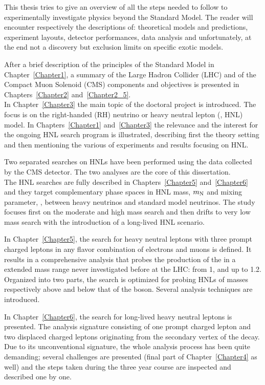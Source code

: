 This thesis tries to give an overview of all the steps needed to follow
to experimentally investigate physics
beyond the Standard Model. The reader will encounter respectively the
descriptions of: theoretical models and predictions, experiment
layouts, detector performances, data analysis and unfortunately, at the
end not a discovery but exclusion limits on specific exotic models.

After a brief description of the principles of the Standard Model in
Chapter~\ref{Chapter1}, a summary of the Large Hadron Collider (LHC)
and of the Compact Muon Solenoid (CMS) components and objectives is
presented in Chapters~\ref{Chapter2} and~\ref{Chapter2_5}.\\
In Chapter~\ref{Chapter3} the main topic of the doctoral project is
introduced. The focus is on the right-handed (RH) neutrino or heavy
neutral lepton (\hnl, HNL)
model. In Chapters~\ref{Chapter1} and~\ref{Chapter3} 
the relevance and the interest for the
ongoing HNL search program is illustrated, describing first the theory setting 
and then mentioning the various of experiments and results
focusing on HNL.

Two separated searches on HNLs have been performed using the data
collected by the CMS detector. The two analyses are the core of this
dissertation.\\
The HNL searches are fully described in Chapters~\ref{Chapter5}
and~\ref{Chapter6} and they target complementary phase spaces in HNL mass, $m_\mathrm{N}$
and mixing parameter, \mixpar, between heavy neutrinos and standard
model neutrinos. The study focuses first on the
moderate and high mass search and then drifts to very low mass search with
the introduction of a long-lived HNL scenario.

In Chapter~\ref{Chapter5}, the search for heavy neutral leptons with three
prompt charged leptons in any flavor combination of electrons and
muons is defined. It results in a comprehensive analysis that probes the production of the
\hnl in a extended mass range never investigated before at the LHC:
from 1\GeV, and up to 1.2\TeV. 
Organized into two parts, the search is optimized for
probing HNLs of masses respectively above and below that of the \PW
boson. Several analysis techniques are introduced.

In Chapter~\ref{Chapter6}, the search for long-lived heavy neutral
leptons is presented. The analysis signature
consisting of one prompt charged lepton and two displaced
charged leptons originating from the secondary vertex of the \hnl
decay. Due to its unconventional signature, the whole analysis process has been
quite demanding; several challenges are presented (final part of
Chapter~\ref{Chapter4} as well) and the steps taken during the three
year course are inspected and described one by one.

